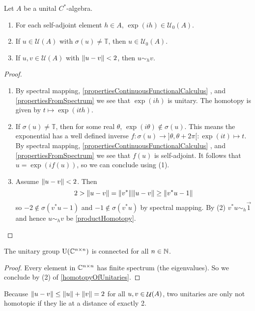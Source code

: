 \begin{lemma} \label{homotopyOfUnitaries}
Let $A$ be a unital $C^*$-algebra.
\begin{enumerate}
\item For each self-adjoint element $h\in A$, $\exp(ih)\in\mathcal{U}_0(A)$.
\item If $u\in \mathcal{U}(A)$ with $\sigma(u) \neq \mathbb{T}$, then $u\in\mathcal{U}_0(A)$.
\item If $u,v\in\mathcal{U}(A)$ with $\lVert u-v\rVert<2$, then $u\sim_h v$.
\end{enumerate}
\end{lemma}
\begin{proof} \hspace{1em}
\begin{enumerate}
\item By spectral mapping, \ref{propertiesContinuousFunctionalCalculus} , and \ref{propertiesFromSpectrum} we see that $\exp(ih)$ is unitary. The homotopy is given by $t\mapsto \exp(ith)$.
\item If $\sigma(u) \neq \mathbb{T}$, then for some real $\theta$, $\exp(i\theta)\notin \sigma(u)$. This means the exponential has a well defined inverse $f: \sigma(u) \to ]\theta, \theta+2\pi[: \exp(it)\mapsto t$. By spectral mapping, \ref{propertiesContinuousFunctionalCalculus} , and \ref{propertiesFromSpectrum} we see that $f(u)$ is self-adjoint. It follows that $u = \exp(if(u))$, so we can conclude using (1).
\item Assume $\lVert u-v\rVert<2$. Then
\[ 2 > \lVert u-v\rVert = \lVert v^*\rVert\lVert u-v\rVert \geq \lVert v^*u - 1\rVert \]
so $-2\notin \sigma(v^*u-1)$ and $-1 \notin \sigma(v^*u)$ by spectral mapping. By (2) $v^*u \sim_h \vec{1}$ and hence $u\sim_h v$ be \ref{productHomotopy}.
\end{enumerate}
\end{proof}

\begin{corollary}
The unitary group $\operatorname{U}(\mathbb{C}^{n\times n})$ is connected for all $n\in\mathbb{N}$.
\end{corollary}
\begin{proof}
Every element in $\mathbb{C}^{n\times n}$ has finite spectrum (the eigenvalues). So we conclude by (2) of \ref{homotopyOfUnitaries}.
\end{proof}
Because $\lVert u-v\rVert\leq \lVert u\rVert+\lVert v\rVert = 2$ for all $u,v\in \mathop{\mathcal{U}}\nolimits(A)$, two unitaries are only not homotopic if they lie at a distance of exactly 2.

